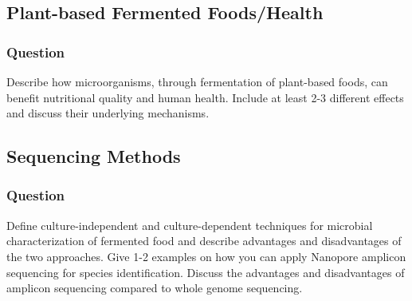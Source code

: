 \subsection{Plant-based Fermented Foods/Health}
\subsubsection*{Question}
Describe how microorganisms, through fermentation of plant-based foods, can benefit nutritional quality and human health. Include at least 2-3 different effects and discuss their underlying mechanisms. 

\subsection{Sequencing Methods}
\subsubsection*{Question}
Define culture-independent and culture-dependent techniques for microbial characterization of fermented food and describe advantages and disadvantages of the two approaches. Give 1-2 examples on how you can apply Nanopore amplicon sequencing for species identification. Discuss the advantages and disadvantages of amplicon sequencing compared to whole genome sequencing. 


